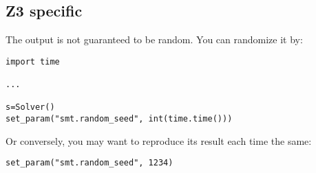 \subsection{Z3 specific}

The output is not guaranteed to be random.
You can randomize it by:

\begin{lstlisting}
import time

...

s=Solver()
set_param("smt.random_seed", int(time.time()))
\end{lstlisting}

Or conversely, you may want to reproduce its result each time the same:

\begin{lstlisting}
set_param("smt.random_seed", 1234)
\end{lstlisting}
